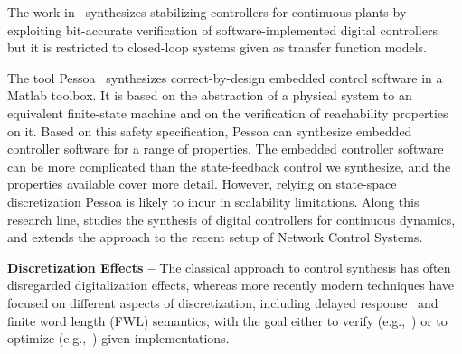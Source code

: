 \documentclass[sigconf]{llncs}
\begin{document}
The work in~\cite{hscc-paper} synthesizes stabilizing controllers for
continuous plants
by exploiting bit-accurate verification of software-implemented
digital controllers~\cite{Bessa16} but it is restricted to closed-loop
systems given as transfer function models.


The tool Pessoa~\cite{mazo2010pessoa} synthesizes correct-by-design embedded
control software in a Matlab toolbox.  It is based on the abstraction of a
physical system to an equivalent finite-state machine and on the
verification of reachability properties on it.  Based on this safety
specification, \mbox{Pessoa} can synthesize embedded controller software for
a range of properties.  The embedded controller software can be more
complicated than the state-feedback control we synthesize, and the
properties available cover more detail.  However, relying on state-space
discretization \mbox{Pessoa} is likely to incur in scalability limitations. 
Along this research line, \cite{Anta2010,liu16} studies the synthesis of
digital controllers for continuous dynamics, and \cite{zamani2014} extends
the approach to the recent setup of Network Control Systems.

\noindent\textbf{Discretization Effects --}
The classical approach to control synthesis has often disregarded
digitalization effects, whereas more recently modern techniques have focused
on different aspects of discretization, including delayed
response~\cite{Duggirala2015} and finite word length (FWL) semantics, with
the goal either to verify (e.g.,~\cite{daes20161}) or to optimize
(e.g.,~\cite{oudjida2014design}) given implementations.
\end{document}
